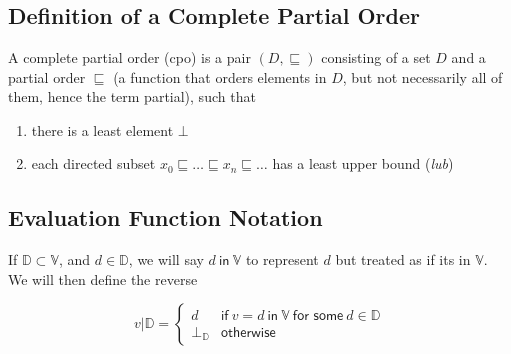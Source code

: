 \appendix
\chapter{} %
\section{Definition of a Complete Partial Order}\label{sec:defin-compl-part}
A complete partial order (cpo) is a pair $(D, \sqsubseteq)$ consisting of a set
$D$ and a partial order $\sqsubseteq$ (a function that orders elements in
$D$, but not necessarily all of them, hence the term partial), such
that
\begin{enumerate}
\item there is a least element $\bot$
\item each directed subset $x_0 \sqsubseteq \ldots \sqsubseteq x_n \sqsubseteq \ldots$ has a least upper bound
  (\emph{lub})
\end{enumerate}

\section{Evaluation Function Notation}\label{sec:eval-funct-notat}
If $\mathbb{D} \subset \mathbb{V}$, and $d \in \mathbb{D}$, we will say $d \ \mathsf{in} \
\mathbb{V}$ to represent $d$ but treated as if its in $\mathbb{V}$. \\
We will then define the reverse

\[
  v | \mathbb{D} =
\begin{cases}
  d & \textsf{if} \ v = d \ \textsf{in} \ \mathbb{V} \ \textsf{for
    some} \ d \in \mathbb{D} \\
  \bot_{\mathbb{D}} & \textsf{otherwise}
\end{cases}
\]

